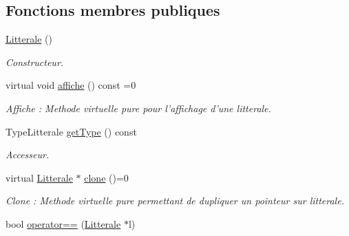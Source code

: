 \subsection*{Fonctions membres publiques}
\begin{CompactItemize}
\item 
\hypertarget{class_litterale_a0a02717ec75f502f1afdb6ac597efac}{
\hyperlink{class_litterale_a0a02717ec75f502f1afdb6ac597efac}{Litterale} ()}
\label{class_litterale_a0a02717ec75f502f1afdb6ac597efac}

\begin{CompactList}\small\item\em Constructeur. \item\end{CompactList}\item 
\hypertarget{class_litterale_d67121b10b76b2283940c52cb3b26185}{
virtual void \hyperlink{class_litterale_d67121b10b76b2283940c52cb3b26185}{affiche} () const =0}
\label{class_litterale_d67121b10b76b2283940c52cb3b26185}

\begin{CompactList}\small\item\em Affiche : Methode virtuelle pure pour l'affichage d'une litterale. \item\end{CompactList}\item 
TypeLitterale \hyperlink{class_litterale_a974ab68a06e8a8b15d04ecd4ce8065a}{getType} () const 
\begin{CompactList}\small\item\em Accesseur. \item\end{CompactList}\item 
\hypertarget{class_litterale_aaadc01ca2bb0c9210f9de083130768b}{
virtual \hyperlink{class_litterale}{Litterale} $\ast$ \hyperlink{class_litterale_aaadc01ca2bb0c9210f9de083130768b}{clone} ()=0}
\label{class_litterale_aaadc01ca2bb0c9210f9de083130768b}

\begin{CompactList}\small\item\em Clone : Methode virtuelle pure permettant de dupliquer un pointeur sur litterale. \item\end{CompactList}\item 
\hypertarget{class_litterale_257dc6d6f3c4d8458d45be92ceede634}{
bool \hyperlink{class_litterale_257dc6d6f3c4d8458d45be92ceede634}{operator==} (\hyperlink{class_litterale}{Litterale} $\ast$l)}
\label{class_litterale_257dc6d6f3c4d8458d45be92ceede634}


\end{CompactItemize}
